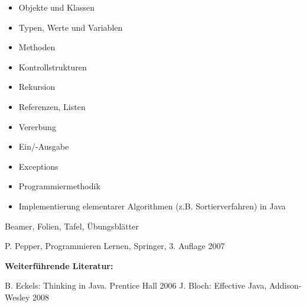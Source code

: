 \begin{course}
\begin{content}
\begin{itemize}\item Objekte und Klassen  \item Typen, Werte und Variablen  \item Methoden  \item Kontrollstrukturen  \item Rekursion  \item Referenzen, Listen  \item Vererbung   \item Ein/-Ausgabe  \item Exceptions  \item Programmiermethodik  \item Implementierung elementarer Algorithmen (z.B. Sortierverfahren) in Java  \end{itemize}
\end{content}

\begin{media}Beamer, Folien, Tafel, Übungsblätter

\end{media}

\begin{literature}P. Pepper, Programmieren Lernen, Springer, 3. Auflage 2007

 

\textbf{Weiterführende Literatur:}

 

B. Eckels: Thinking in Java. Prentice Hall 2006\newline
J. Bloch: Effective Java, Addison-Wesley 2008

\end{literature}



\end{course}